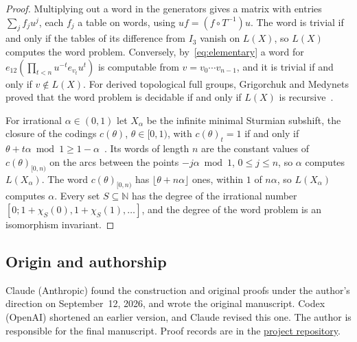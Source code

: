 \documentclass[11pt]{amsart}
\begin{document}
\begin{proof}
Multiplying out a word in the generators gives a matrix with entries
$\sum_jf_ju^j$, each $f_j$ a table on words, using $uf=(f\circ T^{-1})u$.
The word is trivial if and only if the tables of its difference from
$I_3$ vanish on $L(X)$, so $L(X)$ computes the word problem. Conversely,
by~\eqref{eq:elementary} a word for $e_{12}(\prod_{t<n}u^{-t}e_{v_t}u^t)$
is computable from $v=v_0\cdots v_{n-1}$, and it is trivial if and only
if $v\notin L(X)$. For derived topological full groups, Grigorchuk and
Medynets proved that the word problem is decidable if and only if
$L(X)$ is recursive~\cite[Theorem~1.1(3)]{GMpres}.

For irrational $\alpha\in(0,1)$ let $X_\alpha$ be the infinite minimal
Sturmian subshift, the closure of the codings $c(\theta)$,
$\theta\in[0,1)$, with $c(\theta)_t=1$ if and only if
$\theta+t\alpha\bmod1\ge1-\alpha$~\cite{MorseHedlund}. Its words of
length $n$ are the constant values of $c(\theta)_{[0,n)}$ on the arcs
between the points $-j\alpha\bmod1$, $0\le j\le n$, so $\alpha$ computes
$L(X_\alpha)$. The word $c(\theta)_{[0,n)}$ has
$\lfloor\theta+n\alpha\rfloor$ ones, within $1$ of $n\alpha$, so
$L(X_\alpha)$ computes $\alpha$. Every set $S\subseteq\mathbb N$ has the
degree of the irrational number $[0;1+\chi_S(0),1+\chi_S(1),\dots]$, and
the degree of the word problem is an isomorphism invariant.
\end{proof}

\subsection*{Origin and authorship}
Claude (Anthropic) found the construction and original proofs under
the author's direction on September~12, 2026, and wrote the original
manuscript. Codex (OpenAI) shortened an earlier version, and Claude
revised this one.
The author is responsible for the final manuscript. Proof records are
in the \href{https://github.com/SauersML/group-approximation}{project repository}.
\end{document}
